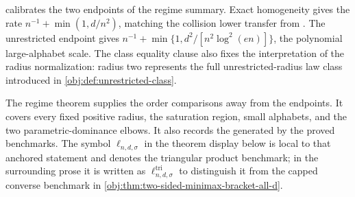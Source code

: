  calibrates the two endpoints of the regime summary. Exact homogeneity gives the rate \(n^{-1}+\min(1,d/n^2)\), matching the collision lower transfer from \citet{ZengBalakrishnanHanKennedy2024}. The unrestricted endpoint gives \(n^{-1}+\min\{1,d^2/[n^2\log^2(en)]\}\), the polynomial large-alphabet scale. The class equality clause also fixes the interpretation of the radius normalization: radius two represents the full unrestricted-radius law class introduced in \cref{obj:def:unrestricted-class}.

The regime theorem supplies the order comparisons away from the endpoints. It covers every fixed positive radius, the saturation region, small alphabets, and the two parametric-dominance elbows. It also records the  generated by the proved benchmarks.
The symbol \(\ell_{n,d,\sigma}\) in the theorem display below is local to that anchored statement and denotes the triangular product benchmark; in the surrounding prose it is written as \(\ell^{\mathrm{tri}}_{n,d,\sigma}\) to distinguish it from the capped converse benchmark in \cref{obj:thm:two-sided-minimax-bracket-all-d}.

